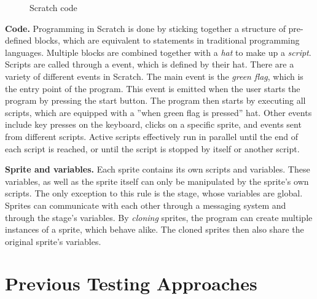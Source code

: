 \begin{figure}[htpb]
    \centering
    \caption{Scratch code}
    \label{fig:scratch_code}
\end{figure}

\textbf{Code.}
Programming in Scratch is done by sticking together a structure of pre-defined blocks, which are equivalent to statements in traditional programming languages.
Multiple blocks are combined together with a \textit{hat} to make up a \textit{script}.
Scripts are called through a event, which is defined by their hat. %
There are a variety of different events in Scratch.
The main event is the \textit{green flag}, which is the entry point of the program.
This event is emitted when the user starts the program by pressing the start button.
The program then starts by executing all scripts, which are equipped with a ''when green flag is pressed'' hat.
Other events include key presses on the keyboard, clicks on a specific sprite, and events sent from different scripts.
Active scripts effectively run in parallel until the end of each script is reached, or until the script is stopped by itself or another script.
\parspace

\textbf{Sprite and variables.}
Each sprite contains its own scripts and variables.
These variables, as well as the sprite itself can only be manipulated by the sprite's own scripts.
The only exception to this rule is the stage, whose variables are global.
Sprites can communicate with each other through a messaging system and through the stage's variables.
By \textit{cloning} sprites, the program can create multiple instances of a sprite, which behave alike.
The cloned sprites then also share the original sprite's variables.

\section{Previous Testing Approaches}%
\label{sec:previous_testing_approaches}

